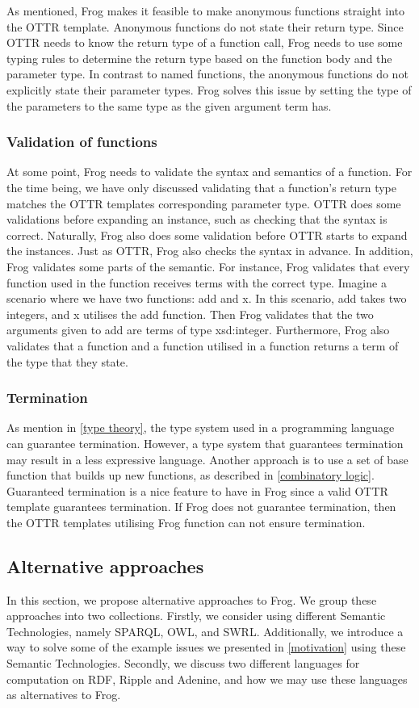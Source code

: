 \para 
As mentioned, Frog makes it feasible to make anonymous functions straight into the OTTR template. Anonymous functions do not state their return type. Since OTTR needs to know the return type of a function call, Frog needs to use some typing rules to determine the return type based on the function body and the parameter type. In contrast to named functions, the anonymous functions do not explicitly state their parameter types. Frog solves this issue by setting the type of the parameters to the same type as the given argument term has. 

\subsubsection{Validation of functions}
At some point, Frog needs to validate the syntax and semantics of a function. For the time being, we have only discussed validating that a function's return type matches the OTTR templates corresponding parameter type. OTTR does some validations before expanding an instance, such as checking that the syntax is correct. Naturally, Frog also does some validation before OTTR starts to expand the instances. Just as OTTR, Frog also checks the syntax in advance. In addition, Frog validates some parts of the semantic. For instance, Frog validates that every function used in the function receives terms with the correct type. Imagine a scenario where we have two functions: add and x. In this scenario, add takes two integers, and x utilises the add function. Then Frog validates that the two arguments given to add are terms of type xsd:integer. Furthermore, Frog also validates that a function and a function utilised in a function returns a term of the type that they state.

\subsubsection{Termination}
As mention in \autoref{type theory}, the type system used in a programming language can guarantee termination. However, a type system that guarantees termination may result in a less expressive language. Another approach is to use a set of base function that builds up new functions, as described in \autoref{combinatory logic}. Guaranteed termination is a nice feature to have in Frog since a valid OTTR template guarantees termination. If Frog does not guarantee termination, then the OTTR templates utilising Frog function can not ensure termination. 

\subsection{Alternative approaches}
In this section, we propose alternative approaches to Frog. We group these approaches into two collections. Firstly, we consider using different Semantic Technologies, namely SPARQL, OWL, and SWRL. Additionally, we introduce a way to solve some of the example issues we presented in \autoref{motivation} using these Semantic Technologies. Secondly, we discuss two different languages for computation on RDF, Ripple and Adenine, and how we may use these languages as alternatives to Frog.


